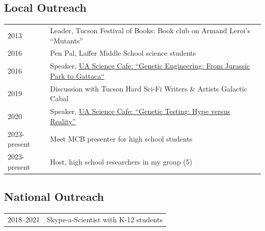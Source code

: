 \documentclass[11pt]{article}
\begin{document}
\subsection*{Local Outreach}
\begin{longtable}[l]{l l}
2013 & Leader, Tucson Festival of Books: Book club on Armand Leroi's ``Mutants''\\
2016 & Pen Pal, Laffer Middle School science students\\
2016 & Speaker, \href{https://www.youtube.com/watch?v=0s-kFTu24dg}{UA Science Cafe: ``Genetic Engineering: From Jurassic Park to Gattaca``}\\
2019 & Discussion with Tucson Hard Sci-Fi Writers \& Artists Galactic Cabal\\
2020 & Speaker, \href{https://www.youtube.com/watch?v=je5GcyU6CYc}{UA Science Cafe: ``Genetic Testing: Hype versus Reality''}\\
2023-present & Meet MCB presenter for high school students\\
2023-present & Host, high school researchers in my group (5) %
\\
\end{longtable}

\subsection*{National Outreach}
\begin{longtable}[l]{l l}
2018--2021 & Skype-a-Scientist with K-12 students\\
\end{longtable}
\end{document}
